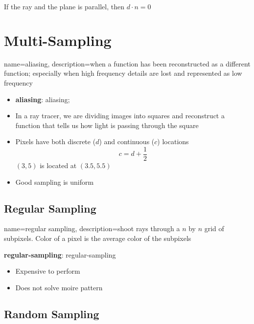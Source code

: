     If the ray and the plane is parallel, then $ d \cdot n = 0 $

\section{Multi-Sampling}

  {
    name=aliasing,
    description={when a function has been reconstructed as a
    different function; especially when high frequency details are lost and
    represented as low frequency}
  }

  \begin{itemize}
    \item \textbf{\Gls{aliasing}}: \Glsdesc{aliasing};
    \item In a ray tracer, we are dividing images into squares and reconstruct
    a function that tells us how light is passing through the square
    \item Pixels have both discrete ($ d $) and continuous ($ c $) locations
    \begin{equation}
      c = d + \frac{1}{2}
    \end{equation}
    $ \left( 3, 5 \right) $ is located at $ \left( 3.5, 5.5 \right) $

    \item Good sampling is uniform
  \end{itemize}

  \subsection{Regular Sampling}

    {
      name=regular sampling,
      description={shoot rays through a $ n $ by $ n $ grid of subpixels.
      Color of a pixel is the average color of the subpixels}
    }

    \textbf{\Gls{regular-sampling}}: \glsdesc{regular-sampling}

    \begin{itemize}
      \item Expensive to perform
      \item Does not solve moire pattern
    \end{itemize}

  \subsection{Random Sampling}

